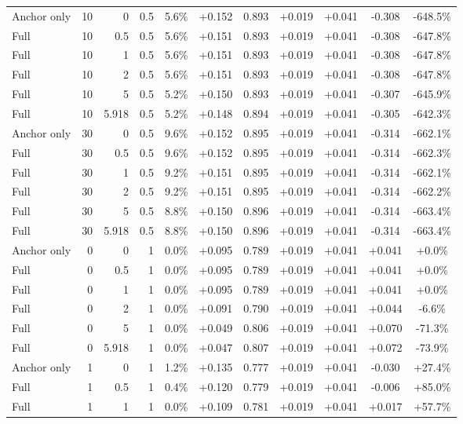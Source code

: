 \begin{table}[htbp]
\begin{tabular}{lrrrccccccc}
Anchor only & 10 & 0 & 0.5 & 5.6\% & +0.152 & 0.893 & +0.019 & +0.041 & -0.308 & -648.5\% \\
Full & 10 & 0.5 & 0.5 & 5.6\% & +0.151 & 0.893 & +0.019 & +0.041 & -0.308 & -647.8\% \\
Full & 10 & 1 & 0.5 & 5.6\% & +0.151 & 0.893 & +0.019 & +0.041 & -0.308 & -647.8\% \\
Full & 10 & 2 & 0.5 & 5.6\% & +0.151 & 0.893 & +0.019 & +0.041 & -0.308 & -647.8\% \\
Full & 10 & 5 & 0.5 & 5.2\% & +0.150 & 0.893 & +0.019 & +0.041 & -0.307 & -645.9\% \\
Full & 10 & 5.918 & 0.5 & 5.2\% & +0.148 & 0.894 & +0.019 & +0.041 & -0.305 & -642.3\% \\
Anchor only & 30 & 0 & 0.5 & 9.6\% & +0.152 & 0.895 & +0.019 & +0.041 & -0.314 & -662.1\% \\
Full & 30 & 0.5 & 0.5 & 9.6\% & +0.152 & 0.895 & +0.019 & +0.041 & -0.314 & -662.3\% \\
Full & 30 & 1 & 0.5 & 9.2\% & +0.151 & 0.895 & +0.019 & +0.041 & -0.314 & -662.1\% \\
Full & 30 & 2 & 0.5 & 9.2\% & +0.151 & 0.895 & +0.019 & +0.041 & -0.314 & -662.2\% \\
Full & 30 & 5 & 0.5 & 8.8\% & +0.150 & 0.896 & +0.019 & +0.041 & -0.314 & -663.4\% \\
Full & 30 & 5.918 & 0.5 & 8.8\% & +0.150 & 0.896 & +0.019 & +0.041 & -0.314 & -663.4\% \\
Anchor only & 0 & 0 & 1 & 0.0\% & +0.095 & 0.789 & +0.019 & +0.041 & +0.041 & +0.0\% \\
Full & 0 & 0.5 & 1 & 0.0\% & +0.095 & 0.789 & +0.019 & +0.041 & +0.041 & +0.0\% \\
Full & 0 & 1 & 1 & 0.0\% & +0.095 & 0.789 & +0.019 & +0.041 & +0.041 & +0.0\% \\
Full & 0 & 2 & 1 & 0.0\% & +0.091 & 0.790 & +0.019 & +0.041 & +0.044 & -6.6\% \\
Full & 0 & 5 & 1 & 0.0\% & +0.049 & 0.806 & +0.019 & +0.041 & +0.070 & -71.3\% \\
Full & 0 & 5.918 & 1 & 0.0\% & +0.047 & 0.807 & +0.019 & +0.041 & +0.072 & -73.9\% \\
Anchor only & 1 & 0 & 1 & 1.2\% & +0.135 & 0.777 & +0.019 & +0.041 & -0.030 & +27.4\% \\
Full & 1 & 0.5 & 1 & 0.4\% & +0.120 & 0.779 & +0.019 & +0.041 & -0.006 & +85.0\% \\
Full & 1 & 1 & 1 & 0.0\% & +0.109 & 0.781 & +0.019 & +0.041 & +0.017 & +57.7\% \\

\end{tabular}
\end{table}
